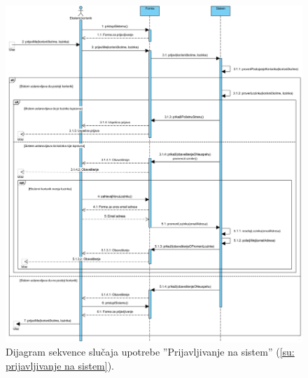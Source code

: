 \begin{figure}[H]
	\centering
	\includegraphics[width=\textwidth]{dijagrami/dijagrami-sekvence/prijavljivanje-na-sistem.png}
	\caption{Dijagram sekvence slu\v caja upotrebe ''Prijavljivanje na sistem'' (\ref{su: prijavljivanje na sistem}).}
\end{figure}

